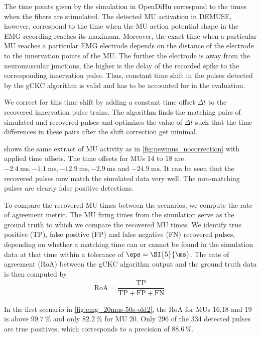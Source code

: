 The  time points given by the simulation in OpenDiHu correspond to the times when the fibers are stimulated. The detected MU activation in DEMUSE, however, correspond to the time when the MU action potential shape in the EMG recording reaches its maximum.
Moreover, the exact time when a particular MU reaches a particular EMG electrode  depends on the distance of the electrode to the innervation points of the MU. The further the electrode is away from the neuromuscular junctions, the higher is the delay of the recorded spike to the corresponding innervation pulse. Thus, constant time shift in the pulses detected by the gCKC algorithm is valid and has to be accounted for in the evaluation.

We correct for this time shift by adding a constant time offset $\Delta t$ to the recovered innervation pulse trains. The algorithm finds the matching pairs of simulated and recovered pulses and optimizes the value of $\Delta t$ such that the time differences in these pairs after the shift correction get minimal.

 shows the same extract of MU activity as in \cref{fig:newmus_nocorrection} with applied time offsets. The time offsets for MUs 14 to 18 are $\SI{-2.4}{\ms}, \SI{-1.1}{\ms}, \SI{-12.9}{\ms}, \SI{-2.9}{\ms}$ and $\SI{-24.9}{\ms}$. It can be seen that the recovered pulses now match the simulated data very well. The non-matching pulses are clearly false positive detections.

To compare the recovered MU times between the scenarios, we compute the rate of agreement metric. The MU firing times from the simulation serve as the ground truth to which we compare the recovered MU times. We identify true positive (TP), false positive (FP) and false negative (FN) recovered pulses, depending on whether a matching time can or cannot be found in the simulation data at that time within a tolerance of $\eps=\SI{5}{\ms}$. The rate of agreement (RoA) between the gCKC algorithm output and the ground truth data is then computed by%
\begin{align*}
  \textrm{RoA}  = \dfrac{\textrm{TP}}{\textrm{TP} + \textrm{FP} + \textrm{FN}}.
\end{align*}

In the first scenario in \cref{fig:emg_20mus-50s-old2}, the RoA for MUs 16,18 and 19 is above $\SI{99.7}{\percent}$ and only $\SI{82.2}{\percent}$ for MU 20. Only 296 of the 334 detected pulses are true positives, which corresponds to a precision of $\SI{88.6}{\percent}$.
 
